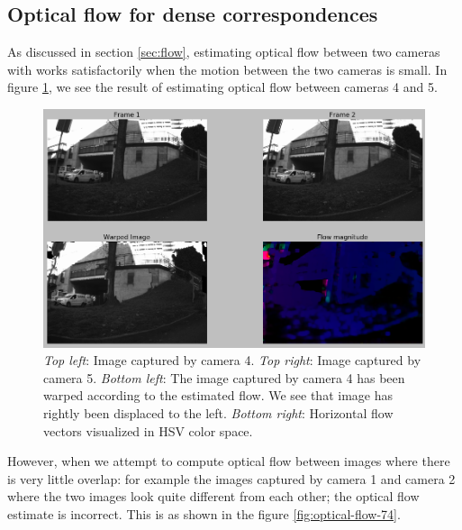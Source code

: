 \documentclass[10pt,twocolumn,letterpaper]{article}
\begin{document}
\subsection{Optical flow for dense correspondences}
\label{sec:challenges-flow}
As discussed in section \ref{sec:flow}, estimating optical flow between two cameras with \cite{farneback} works satisfactorily when the motion between the two cameras is small. In figure \ref{fig:optical-flow-45}, we see the result of estimating optical flow between cameras 4 and 5. 
\begin{figure}
\centering
\includegraphics[width=\linewidth]{../results/optical-flow/cam4-cam5-proper.png}
\caption{\textit{Top left}:  Image captured by camera 4. \textit{Top right}: Image captured by camera 5. \textit{Bottom left}: The image captured by camera 4 has been warped according to the estimated flow. We see that image has rightly been displaced to the left. \textit{Bottom right}: Horizontal flow vectors visualized in HSV color space.}
\label{fig:optical-flow-45}
\end{figure}

However, when we attempt to compute optical flow between images where there is very little overlap: for example the images captured by camera 1 and camera 2 where the two images look quite different from each other; the optical flow estimate is incorrect. This is as shown in the figure \ref{fig:optical-flow-74}.
\end{document}
